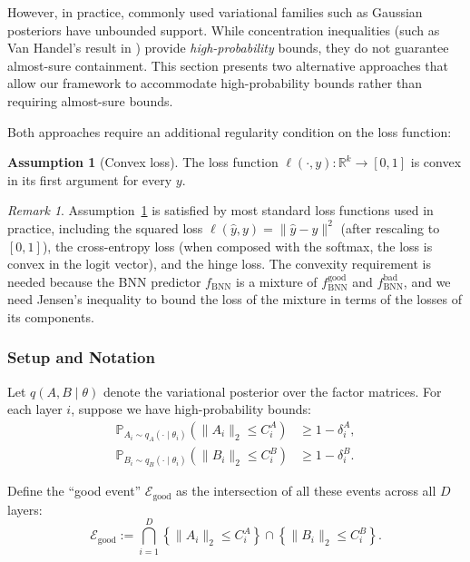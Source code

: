 \documentclass{article}
\theoremstyle{plain}
\theoremstyle{definition}
\newtheorem{assumption}[theorem]{Assumption}
\theoremstyle{remark}
\newtheorem{remark}[theorem]{Remark}
\begin{document}
However, in practice, commonly used variational families such as Gaussian posteriors have unbounded support. While concentration inequalities (such as Van Handel's result in \cite{van2017spectral}) provide \emph{high-probability} bounds, they do not guarantee almost-sure containment. This section presents two alternative approaches that allow our framework to accommodate high-probability bounds rather than requiring almost-sure bounds.

Both approaches require an additional regularity condition on the loss function:

\begin{assumption}[Convex loss]
\label{ass:convex_loss}
The loss function $\ell(\cdot, y): \mathbb{R}^k \to [0,1]$ is convex in its first argument for every $y$.
\end{assumption}

\begin{remark}
Assumption~\ref{ass:convex_loss} is satisfied by most standard loss functions used in practice, including the squared loss $\ell(\hat{y},y) = \|\hat{y}-y\|^2$ (after rescaling to $[0,1]$), the cross-entropy loss (when composed with the softmax, the loss is convex in the logit vector), and the hinge loss. The convexity requirement is needed because the BNN predictor $f_{\mathrm{BNN}}$ is a mixture of $f_{\mathrm{BNN}}^{\mathrm{good}}$ and $f_{\mathrm{BNN}}^{\mathrm{bad}}$, and we need Jensen's inequality to bound the loss of the mixture in terms of the losses of its components.
\end{remark}

\subsubsection{Setup and Notation}

Let $q(A, B \mid \theta)$ denote the variational posterior over the factor matrices. For each layer $i$, suppose we have high-probability bounds:
\begin{align}
    \mathbb{P}_{A_i \sim q_A(\cdot\mid\theta_i)}\left(\|A_i\|_2 \leq C_i^A\right) &\geq 1 - \delta_i^A, \label{eq:hp_bound_A}\\
    \mathbb{P}_{B_i \sim q_B(\cdot\mid\theta_i)}\left(\|B_i\|_2 \leq C_i^B\right) &\geq 1 - \delta_i^B. \label{eq:hp_bound_B}
\end{align}

Define the ``good event'' $\mathcal{E}_{\text{good}}$ as the intersection of all these events across all $D$ layers:
\begin{equation}
    \mathcal{E}_{\text{good}} := \bigcap_{i=1}^{D} \left\{ \|A_i\|_2 \leq C_i^A \right\} \cap \left\{ \|B_i\|_2 \leq C_i^B \right\}.
\end{equation}
\end{document}
